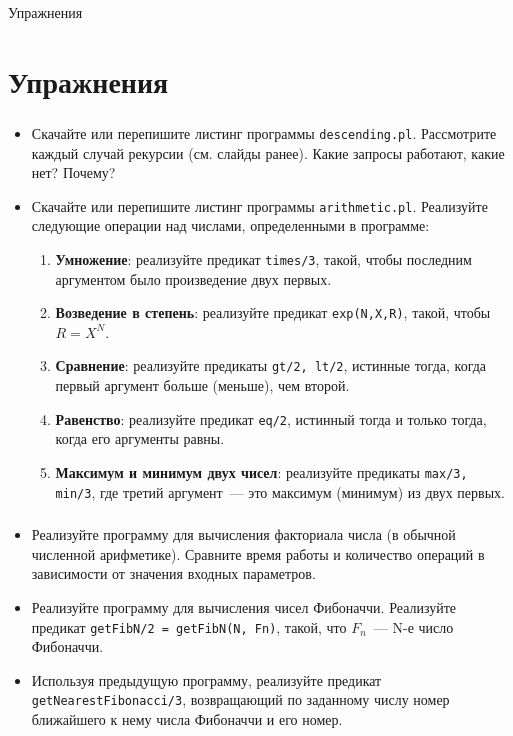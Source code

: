 \begin{frame}[plain,c]

	\begin{center}
		\Huge Упражнения
	\end{center}

\end{frame}


\section{Упражнения}

\begin{frame}
	\frametitle{\insertsection}
	\begin{itemize}
		\item Скачайте или перепишите листинг программы \texttt{descending.pl}. Рассмотрите каждый случай рекурсии (см. слайды ранее). Какие запросы работают, какие нет? Почему?
		\item Скачайте или перепишите листинг программы \texttt{arithmetic.pl}. Реализуйте следующие операции над числами, определенными в программе:
		\begin{enumerate}
			\item \textbf{Умножение}: реализуйте предикат \texttt{times/3}, такой, чтобы последним аргументом было произведение двух первых.
			\item \textbf{Возведение в степень}: реализуйте предикат \texttt{exp(N,X,R)}, такой, чтобы \(R = X^{N}\).
			\item \textbf{Сравнение}: реализуйте предикаты \texttt{gt/2, lt/2}, истинные тогда, когда первый аргумент больше (меньше), чем второй.
			\item \textbf{Равенство}: реализуйте предикат \texttt{eq/2}, истинный тогда и только тогда, когда его аргументы равны.
			\item \textbf{Максимум и минимум двух чисел}: реализуйте предикаты \texttt{max/3, min/3}, где третий аргумент~--- это максимум (минимум) из двух первых.
		\end{enumerate}
	\end{itemize}
\end{frame}

\begin{frame}
	\frametitle{\insertsection}
	\begin{itemize}
		\item Реализуйте программу для вычисления факториала числа (в обычной численной арифметике). Сравните время работы и количество операций в зависимости от значения входных параметров.
		\item Реализуйте программу для вычисления чисел Фибоначчи. Реализуйте предикат \texttt{getFibN/2 = getFibN(N, Fn)}, такой, что \(F_n\)~--- N-е число Фибоначчи.
		\item Используя предыдущую программу, реализуйте предикат \texttt{getNearestFibonacci/3}, возвращающий по заданному числу номер ближайшего к нему числа Фибоначчи и его номер.
	\end{itemize}
\end{frame}



